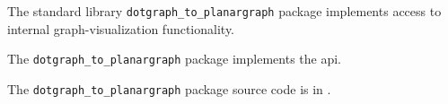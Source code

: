 
The standard library {\tt dotgraph\_to\_planargraph} package implements access to internal graph-visualization functionality. 

The {\tt dotgraph\_to\_planargraph} package implements the  api.

The {\tt dotgraph\_to\_planargraph} package source code is in .
